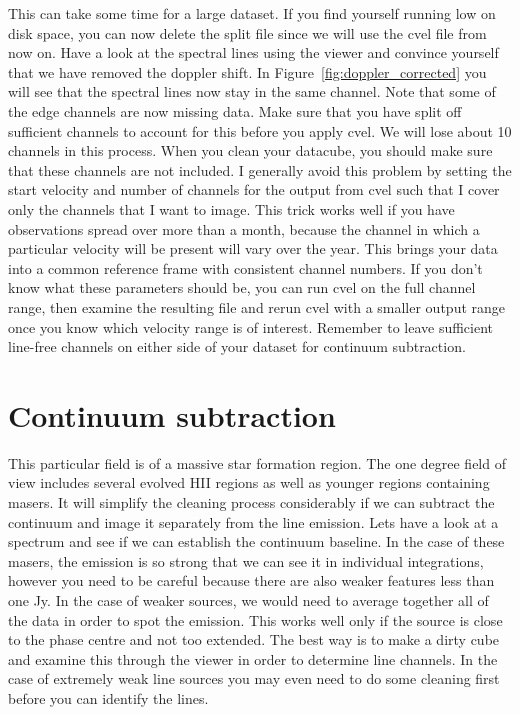 \documentclass[force,almostfull,justified]{tufte-book}
\begin{document}
This can take some time for a large dataset.  If you find yourself
running low on disk space, you can now delete the split file since we
will use the cvel file from now on. Have a look at the spectral lines
using the viewer and convince yourself that we have removed the doppler
shift. In Figure~\ref{fig:doppler_corrected} you will see that the
spectral lines now stay in the same channel.  Note that some of the edge
channels are now missing data.  Make sure that you have split off
sufficient channels to account for this before you apply cvel.  We will
lose about 10 channels in this process. When you clean your datacube,
you should make sure that these channels are not included. I generally
avoid this problem by setting the start velocity and number of channels
for the output from cvel such that I cover only the channels that I want
to image.  This trick works well if you have observations spread over
more than a month, because the channel in which a particular velocity
will be present will vary over the year.  This brings your data into a
common reference frame with consistent channel numbers. If you don't
know what these parameters should be, you can run cvel on the full
channel range, then examine the resulting file and rerun cvel with a
smaller output range once you know which velocity range is of interest.
Remember to leave sufficient line-free channels on either side of your
dataset for continuum subtraction.


\section{Continuum subtraction}

This particular field is of a massive star formation region.  The one
degree field of view includes several evolved HII regions as well as
younger regions containing masers.  It will simplify the cleaning
process considerably if we can subtract the continuum and image it
separately from the line emission.  Lets have a look at a spectrum and
see if we can establish the continuum baseline.  In the case of these
masers, the emission is so strong that we can see it in individual
integrations, however you need to be careful because there are also
weaker features less than one Jy.  In the case of weaker sources, we
would need to average together all of the data in order to spot the
emission. This works well only if the source is close to the phase
centre and not too extended.  The best way is to make a dirty cube and
examine this through the viewer in order to determine line channels. In
the case of extremely weak line sources you may even need to do some
cleaning first before you can identify the lines.
\end{document}
